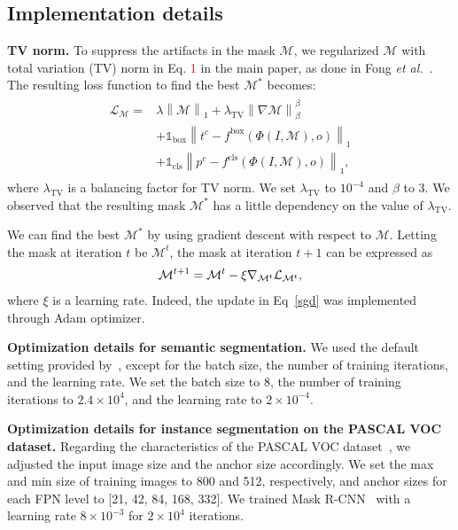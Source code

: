 \documentclass[final]{cvpr}
\begin{document}
\subsection{Implementation details}
\textbf{TV norm.} To suppress the artifacts in the mask $\mathcal{M}$, we regularized $\mathcal{M}$ with total variation (TV) norm in Eq. \textcolor{red}{1} in the main paper, as done in Fong \textit{et al.}~\cite{fong2017interpretable}. The resulting loss function to find the best $\mathcal{M}^{*}$ becomes:
\begin{align}\label{eq_mask_supp}
\begin{split}
\mathcal{L}_{\mathcal{M}} = &\lambda \left\lVert \mathcal{M} \right\rVert_1 + \lambda_{\text{TV}} \left\lVert  \nabla \mathcal{M} \right\rVert_{\beta}^{\beta} \\ &+ \mathbb{1}_{\text{box}} \left\lVert t^c - f^{\text{box}}(\Phi(I, \mathcal{M}), o) \right\rVert_1 \\ &+ \mathbb{1}_{\text{cls}} \left\lVert p^c - f^{\text{cls}}(\Phi(I, \mathcal{M}), o) \right\rVert_1,
\end{split}
\end{align}
where $\lambda_{\text{TV}}$ is a balancing factor for TV norm. We set $\lambda_{\text{TV}}$ to $10^{-4}$ and $\beta$ to $3$.
We observed that the resulting mask $\mathcal{M}^{*}$ has a little dependency on the value of $\lambda_{\text{TV}}$.


We can find the best $\mathcal{M}^{*}$ by using gradient descent with respect to $\mathcal{M}$. Letting the mask at iteration $t$ be $\mathcal{M}^{t}$, the mask at iteration $t+1$ can be expressed as
\begin{align}\label{sgd}
\mathcal{M}^{t+1} = \mathcal{M}^{t} - \xi \nabla_{\mathcal{M}^{t}} \mathcal{L}_{\mathcal{M}^{t}},
\vspace{-0.5em}
\end{align}
where $\xi$ is a learning rate. Indeed, the update in Eq~\ref{sgd} was implemented through Adam optimizer.


\textbf{Optimization details for semantic segmentation.}
We used the default setting provided by~\cite{pytorchdeeplab}, except for the batch size, the number of training iterations, and the learning rate. We set the batch size to 8, the number of training iterations to $2.4\times10^4$, and the learning rate to $2\times10^{-4}$.

\textbf{Optimization details for instance segmentation on the PASCAL VOC dataset.}
Regarding the characteristics of the PASCAL VOC dataset~\cite{everingham2010pascal}, we adjusted the input image size and the anchor size accordingly. We set the max and min size of training images to 800 and 512, respectively, and anchor sizes for each FPN level to [21, 42, 84, 168, 332]. We trained Mask R-CNN~\cite{he2017mask} with a learning rate $8\times10^{-3}$ for $2\times10^4$ iterations.
\end{document}

